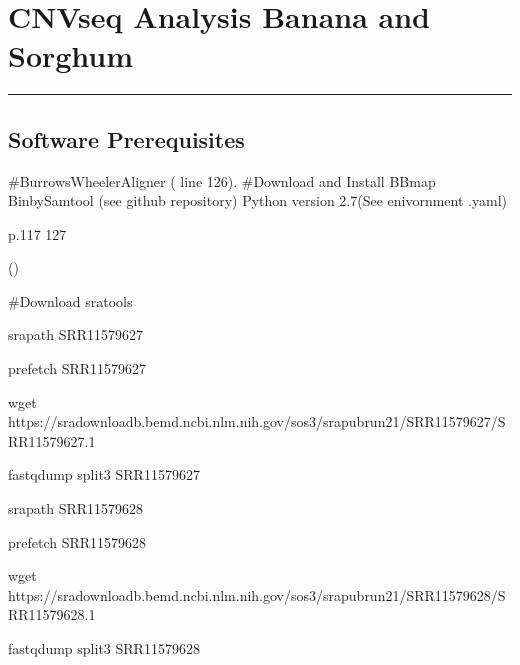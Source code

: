 \documentclass[letterpaper,10pt,english]{sphinxhowto}
\begin{document}
\pagestyle{plain}
\sphinxtableofcontents
\pagestyle{normal}
\label{\detokenize{index::doc}}



\section{CNVseq Analysis Banana and Sorghum}
\label{\detokenize{CNV:cnvseq-analysis-banana-and-sorghum}}\label{\detokenize{CNV::doc}}

\bigskip\hrule\bigskip



\subsection{Software Prerequisites}
\label{\detokenize{CNV:software-prerequisites}}
\sphinxAtStartPar
\#Burrows\sphinxhyphen{}Wheeler\sphinxhyphen{}Aligner
( line 126).
\#Download and Install BBmap
Bin\sphinxhyphen{}by\sphinxhyphen{}Sam\sphinxhyphen{}tool (see github repository)
Python version 2.7(See enivornment .yaml)

\sphinxAtStartPar
{}

\sphinxAtStartPar
{}
p.117 \sphinxhyphen{} 127

\sphinxAtStartPar
()

\sphinxAtStartPar
\#Download sratools

\begin{sphinxVerbatim}[commandchars=\\\{\}]
srapath SRR11579627

prefetch SRR11579627

wget https://sra\PYGZhy{}downloadb.be\PYGZhy{}md.ncbi.nlm.nih.gov/sos3/sra\PYGZhy{}pub\PYGZhy{}run\PYGZhy{}21/SRR11579627/SRR11579627.1


fastq\PYGZhy{}dump \PYGZhy{}\PYGZhy{}split\PYGZhy{}3 SRR11579627


srapath SRR11579628

prefetch SRR11579628

wget https://sra\PYGZhy{}downloadb.be\PYGZhy{}md.ncbi.nlm.nih.gov/sos3/sra\PYGZhy{}pub\PYGZhy{}run\PYGZhy{}21/SRR11579628/SRR11579628.1


fastq\PYGZhy{}dump \PYGZhy{}\PYGZhy{}split\PYGZhy{}3 SRR11579628
\end{sphinxVerbatim}
\end{document}
